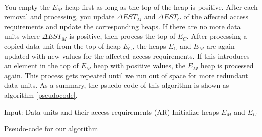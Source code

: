 \\
You empty the $E_M$ heap first as long as the top of the heap is positive. After each removal and processing, you update $\Delta EST_M$ and $\Delta EST_C$ of the affected access requirements and update the corresponding heaps. If there are no more data units where $\Delta EST_M$ is positive, then process the top of $E_C$. After processing a copied data unit from the top of heap $E_C$, the heaps $E_C$ and $E_M$ are again updated with new values for the affected access requirements. If this introduces an element in the top of $E_M$ heap with positive values, the $E_M$ heap is processed again. This process gets repeated until we run out of space for more redundant data units. As a summary, the psuedo-code of this algorithm is shown as algorithm \ref{pseudocode}.

\begin{algorithm}
Input: Data units and their access requirements (AR) \;
Initialize heaps $E_M$ and $E_C$ \;
\caption{Pseudo-code for our algorithm}
\label{pseudocode}
\end{algorithm}

